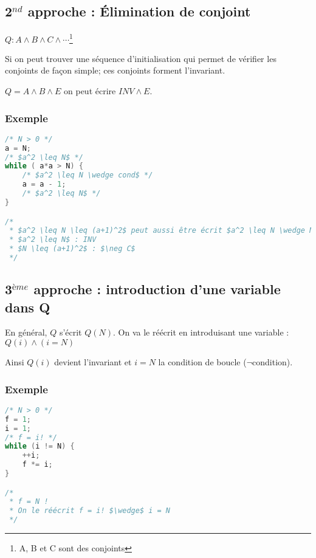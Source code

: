 	
	\subsection{2$^{nd}$ approche : Élimination de conjoint} 
	$Q : A \wedge B \wedge C \wedge \cdots$\footnote{A, B et C sont des conjoints}
	
	Si on peut trouver une séquence d'initialisation qui permet de vérifier les conjoints de façon simple; ces conjoints forment l'invariant.

	$Q = A \wedge B \wedge E$ on peut écrire $INV \wedge E$.

	\subsubsection{Exemple}
\begin{lstlisting}[language=C]
/* N > 0 */
a = N;
/* $a^2 \leq N$ */
while ( a*a > N) {
	/* $a^2 \leq N \wedge cond$ */
	a = a - 1;
	/* $a^2 \leq N$ */
}

/* 
 * $a^2 \leq N \leq (a+1)^2$ peut aussi être écrit $a^2 \leq N \wedge N \leq (a+1)^2$ 
 * $a^2 \leq N$ : INV
 * $N \leq (a+1)^2$ : $\neg C$
 */
\end{lstlisting}


\subsection{3$^{ème}$ approche : introduction d'une variable dans Q} 
	En général, $Q$ s'écrit $Q(N)$. On va le réécrit en introduisant une variable : $Q(i) \wedge (i = N)$

	Ainsi $Q(i)$ devient l'invariant et $i = N$ la condition de boucle ($\neg$condition).

	\subsubsection{Exemple}

\begin{lstlisting}[language=C]
/* N > 0 */
f = 1;
i = 1;
/* f = i! */
while (i != N) {
	++i;	
	f *= i;
}

/* 
 * f = N ! 
 * On le réécrit f = i! $\wedge$ i = N
 */
\end{lstlisting}
